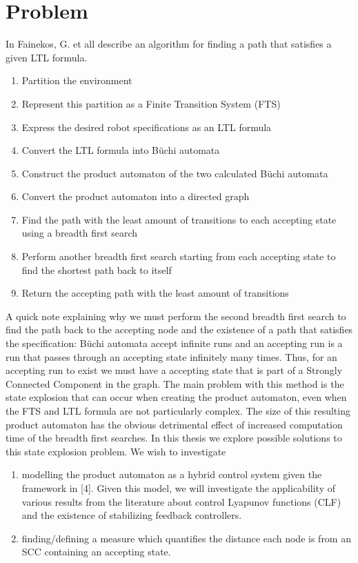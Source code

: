 \documentclass[11pt,a4paper]{article}
\begin{document}
\section{Problem}
In \cite{fainekos09} Fainekos, G. et all describe an algorithm for finding a path that satisfies a given LTL formula. 

\begin{enumerate}
    \item Partition the environment
    \item Represent this partition as a Finite Transition System (FTS)
    \item Express the desired robot specifications as an LTL formula
    \item Convert the LTL formula into  B\"{u}chi automata
    \item Construct the product automaton of the two calculated B\"{u}chi automata
    \item Convert the product automaton into a directed graph
    \item Find the path with the least amount of transitions to each accepting state using a breadth first search
    \item Perform another breadth first search starting from each accepting state to find the shortest path back to itself
    \item Return the accepting path with the least amount of transitions
\end{enumerate}

A quick note explaining why we must perform the second breadth first search to find the path back to the accepting node and the existence of a path that satisfies the specification: B\"{u}chi automata accept infinite runs and an accepting run is a run that passes through an accepting state infinitely many times. Thus, for an accepting run to exist we must have a accepting state that is part of a Strongly Connected Component in the graph.
The main problem with this method is the state explosion that can occur when creating the product automaton, even when the FTS and LTL formula are not particularly complex. The size of this resulting product automaton has the obvious detrimental effect of increased computation time of the breadth first searches. In this thesis we explore possible solutions to this state explosion problem. We wish to investigate
\begin{enumerate}
    \item modelling the product automaton as a hybrid control system given the framework in [4]. Given this model, we will investigate the applicability of various results from the literature about control Lyapunov functions (CLF) and the existence of stabilizing feedback controllers.
    \item finding/defining a measure which quantifies the distance each node is from an SCC containing an accepting state.
\end{enumerate}
\end{document}
